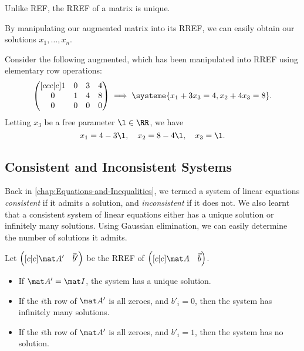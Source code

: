 Unlike REF, the RREF of a matrix is unique.

By manipulating our augmented matrix into its RREF, we can easily obtain our solutions $x_1, \dots, x_n$.

\begin{example}
    Consider the following augmented, which has been manipulated into RREF using elementary row operations: \[\begin{pmatrix}[ccc|c] 1 & 0 & 3 & 4 \\ 0 & 1 & 4 & 8 \\ 0 & 0 & 0 & 0\end{pmatrix} \implies \systeme{x_1 + 3x_3 = 4, x_2 + 4x_3 = 8}.\] Letting $x_3$ be a free parameter $\l \in \RR$, we have \[x_1 = 4 - 3\l, \quad x_2 = 8 - 4\l, \quad x_3 = \l.\]
\end{example}

\subsection{Consistent and Inconsistent Systems}

Back in \SS\ref{chap:Equations-and-Inequalities}, we termed a system of linear equations \emph{consistent} if it admits a solution, and \emph{inconsistent} if it does not. We also learnt that a consistent system of linear equations either has a unique solution or infinitely many solutions. Using Gaussian elimination, we can easily determine the number of solutions it admits.

\begin{proposition}
    Let $\begin{pmatrix}[c|c] \mat A' & \vec b'\end{pmatrix}$ be the RREF of $\begin{pmatrix}[c|c] \mat A & \vec b\end{pmatrix}$.
    \begin{itemize}
        \item If $\mat A' = \mat I$, the system has a unique solution.
        \item If the $i$th row of $\mat A'$ is all zeroes, and $b'_{i} = 0$, then the system has infinitely many solutions.
        \item If the $i$th row of $\mat A'$ is all zeroes, and $b'_{i} = 1$, then the system has no solution.
    \end{itemize}
\end{proposition}

